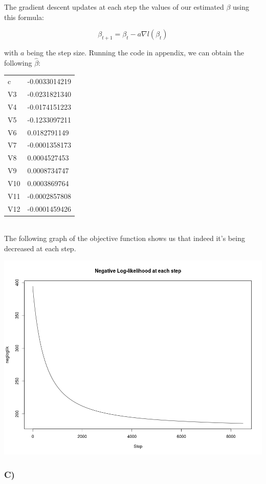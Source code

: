 \documentclass{article}
\begin{document}
The gradient descent updates at each step the values of our estimated $\beta$ using this formula:

\begin{equation*}
\beta_{t+1}=\beta_t-a\nabla l(\beta_t)
\end{equation*}

with $a$ being the step size. Running the code in appendix, we can obtain the following $\hat{\beta}$:\\

\begin{tabular}{ll}
c			&-0.0033014219\\
V3          &-0.0231821340\\
V4          &-0.0174151223\\
V5          &-0.1233097211\\
V6          & 0.0182791149\\
V7          &-0.0001358173\\
V8          & 0.0004527453\\
V9          & 0.0008734747\\
V10         & 0.0003869764\\
V11         &-0.0002857808\\
V12         &-0.0001459426
\end{tabular}\\

The following graph of the objective function shows us that indeed it's being decreased at each step.

\includegraphics[width=\textwidth]{Rplot_gradient.png}

\subsubsection*{C)}
\end{document}
